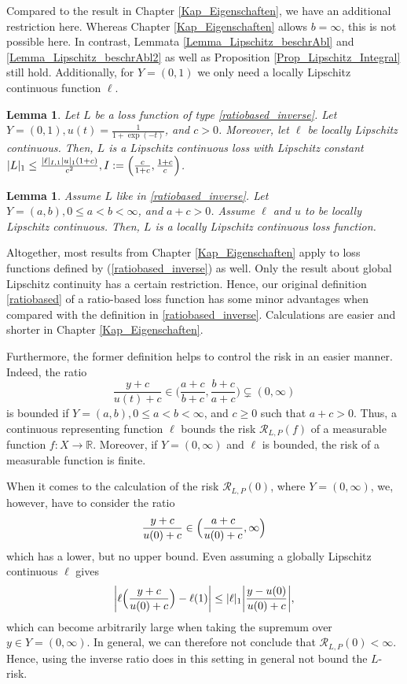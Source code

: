 \documentclass[10pt]{article}
\newcommand{\R}{\mathbb{R}}
\newcommand{\RLP}{\mathcal{R}_{L,P}}
\newtheorem{lemma}[theorem]{Lemma}
\begin{document}
Compared to the result in Chapter \ref{Kap_Eigenschaften}, we have an additional restriction here.
Whereas Chapter \ref{Kap_Eigenschaften} allows $b = \infty$, this is not possible here.
In contrast, Lemmata \ref{Lemma_Lipschitz_beschrAbl} and \ref{Lemma_Lipschitz_beschrAbl2} as well as Proposition \ref{Prop_Lipschitz_Integral} still hold.
Additionally, for $Y = (0,1)$ we only need a locally Lipschitz continuous function $\ell$.
\begin{lemma} \label{altLLipschitzY01}
	Let $L$ be a loss function of type \eqref{ratiobased_inverse}.
	Let $Y = (0,1), u(t) = \frac{1}{1+\exp(-t)}$, and $c > 0$. 
	Moreover, let $\ell$ be locally Lipschitz continuous.
	Then, $L$ is a Lipschitz continuous loss with Lipschitz constant $|L|_1 \leq \frac{|\ell|_{I,1} |u|_1 (1+c)}{c^2}, I := \Bigl(\frac{c}{1+c}, \frac{1+c}{c}\Bigr)$.
\end{lemma}
\begin{lemma} \label{altLLokalLipschitz}
	Assume $L$ like in \eqref{ratiobased_inverse}.
	Let $Y = (a,b), 0 \leq a < b < \infty$, and $a+c>0$. 
	Assume $\ell$ and $u$ to be locally Lipschitz continuous. 
	Then, $L$ is a locally Lipschitz continuous loss function.
\end{lemma}
Altogether, most results from Chapter \ref{Kap_Eigenschaften} apply to loss functions defined by {(\ref{ratiobased_inverse})} as well.
Only the result about global Lipschitz continuity has a certain restriction.
Hence, our original definition \eqref{ratiobased} of a ratio-based loss function has some minor advantages when compared with the definition  in 
\eqref{ratiobased_inverse}.
Calculations are easier and shorter in Chapter \ref{Kap_Eigenschaften}. \par
Furthermore, the former definition helps to control the risk in an easier manner. Indeed, the ratio 
\begin{equation*}
	\frac{y+c}{u(t)+c} \in \biggl(\frac{a+c}{b+c}, \frac{b+c}{a+c}\biggr) \subsetneq (0,\infty)
\end{equation*}
is bounded if $Y = (a,b), 0 \leq a < b < \infty$, and $c \geq 0$ such that $a+c>0$.
Thus, a continuous representing function $\ell$ bounds the risk $\RLP(f)$ of a measurable function $f: X \to \R$.
Moreover, if $Y = (0, \infty)$ and $\ell$ is bounded, the risk of a measurable function is finite. \par
When it comes to the calculation of the risk $\RLP(0)$, where $Y = (0, \infty)$, we, however, have to consider the ratio
\begin{equation*}
	\frac{y+c}{u(0)+c} \in \Bigl(\frac{a+c}{u(0)+c}, \infty \Bigr)
\end{equation*}
which has a lower, but no upper bound.
Even assuming a globally Lipschitz continuous $\ell$ gives
\begin{equation*}
	\biggl|\ell\Bigl(\frac{y+c}{u(0)+c}\Bigr)-\ell(1)\biggr| \leq |\ell|_1 \biggl|\frac{y-u(0)}{u(0)+c}\biggr|,
\end{equation*}
which can become arbitrarily large when taking the supremum over $y \in Y = (0, \infty)$.
In general, we can therefore not conclude that $\RLP(0)< \infty$.
Hence, using the inverse ratio does in this setting in general not bound the $L$-risk.
\end{document}
